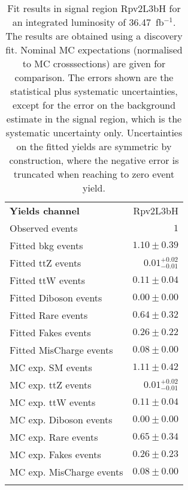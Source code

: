 

\begin{table}
\begin{center}
\setlength{\tabcolsep}{0.0pc}
{\small
\begin{tabular*}{\textwidth}{@{\extracolsep{\fill}}lr}
\noalign{\smallskip}\hline\noalign{\smallskip}
{\bfseries Yields channel}           & Rpv2L3bH              \\[-0.05cm]
\noalign{\smallskip}\hline\noalign{\smallskip}
Observed events          & $1$                    \\
\noalign{\smallskip}\hline\noalign{\smallskip}
Fitted bkg events         & $1.10 \pm 0.39$              \\
\noalign{\smallskip}\hline\noalign{\smallskip}
        Fitted ttZ events         & $0.01_{-0.01}^{+0.02}$              \\
        Fitted ttW events         & $0.11 \pm 0.04$              \\
        Fitted Diboson events         & $0.00 \pm 0.00$              \\
        Fitted Rare events         & $0.64 \pm 0.32$              \\
        Fitted Fakes events         & $0.26 \pm 0.22$              \\
        Fitted MisCharge events         & $0.08 \pm 0.00$              \\
 \noalign{\smallskip}\hline\noalign{\smallskip}
MC exp. SM events              & $1.11 \pm 0.42$              \\
\noalign{\smallskip}\hline\noalign{\smallskip}
        MC exp. ttZ events         & $0.01_{-0.01}^{+0.02}$              \\
        MC exp. ttW events         & $0.11 \pm 0.04$              \\
        MC exp. Diboson events         & $0.00 \pm 0.00$              \\
        MC exp. Rare events         & $0.65 \pm 0.34$              \\
        MC exp. Fakes events         & $0.26 \pm 0.23$              \\
        MC exp. MisCharge events         & $0.08 \pm 0.00$              \\
\noalign{\smallskip}\hline\noalign{\smallskip}
\end{tabular*}
}
\end{center}
\caption{Fit results in signal region Rpv2L3bH for an integrated luminosity of 36.47~fb$^{-1}$.
The results are obtained using a discovery fit. Nominal MC expectations (normalised to MC crosssections) are given for comparison.
The errors shown are the statistical plus systematic uncertainties, except for the error on the background estimate in the signal region, which is the systematic uncertainty only.
Uncertainties on the fitted yields are symmetric by construction, where the negative error is truncated when reaching to zero event yield.
}
\label{table.results.systematics.in.logL.fit..Yields.Rpv2L3bH}
\end{table}
\clearpage
%